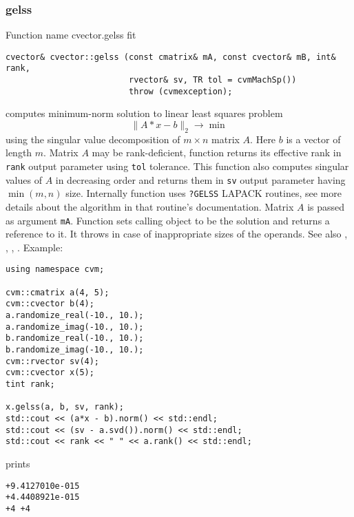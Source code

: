 \subsubsection{gelss}
Function%
\pdfdest name {cvector.gelss} fit
\begin{verbatim}
cvector& cvector::gelss (const cmatrix& mA, const cvector& mB, int& rank,
                         rvector& sv, TR tol = cvmMachSp())
                         throw (cvmexception);
\end{verbatim}
computes  minimum-norm solution to  linear
least squares problem 
\begin{equation*}
\|A*x-b\|_2\to\min
\end{equation*}
using the singular value decomposition of $m\times n$ matrix $A$.
Here $b$ is a vector of length $m$.
Matrix $A$ may be rank-deficient, function returns its effective rank in \verb"rank"
output parameter using \verb"tol" tolerance.
This function also computes
singular values of $A$ in decreasing order and returns them in \verb"sv" output parameter
having $\min(m,n)$ size.
Internally  function uses \verb"?GELSS" LAPACK routines, see more details
about the algorithm in that routine's documentation.
Matrix $A$ is passed as  argument \verb"mA".
Function sets calling object to be the solution and returns a reference to it.
It throws
in case of inappropriate sizes of the operands.
See also , 
, , 
.
Example:
\begin{Verbatim}
using namespace cvm;

cvm::cmatrix a(4, 5);
cvm::cvector b(4);
a.randomize_real(-10., 10.);
a.randomize_imag(-10., 10.);
b.randomize_real(-10., 10.);
b.randomize_imag(-10., 10.);
cvm::rvector sv(4);
cvm::cvector x(5);
tint rank;

x.gelss(a, b, sv, rank);
std::cout << (a*x - b).norm() << std::endl;
std::cout << (sv - a.svd()).norm() << std::endl;
std::cout << rank << " " << a.rank() << std::endl;
\end{Verbatim}
prints
\begin{Verbatim}
+9.4127010e-015
+4.4408921e-015
+4 +4
\end{Verbatim}
\newpage



